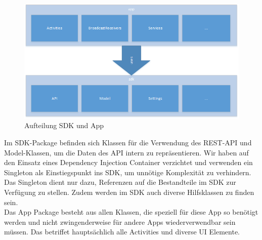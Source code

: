 \begin{figure}[H]
	\centering
		\includegraphics[width=\textwidth]{report/img/android_arch_sdk.png}
	\caption{Aufteilung SDK und App}
	\label{fig:androidArchSdk}
\end{figure}

Im SDK-Package befinden sich Klassen für die Verwendung des REST-API und Model-Klassen, um die Daten des API intern zu repräsentieren. Wir haben auf den Einsatz eines Dependency Injection Container verzichtet und verwenden ein Singleton als Einstiegspunkt ins SDK, um unnötige Komplexität zu verhindern. Das Singleton dient nur dazu, Referenzen auf die Bestandteile im SDK zur Verfügung zu stellen. Zudem werden im SDK auch diverse Hilfsklassen zu finden sein. \\
Das App Package besteht aus allen Klassen, die speziell für diese App so benötigt werden und nicht zwingenderweise für andere Apps wiederverwendbar sein müssen. Das betriffet hauptsächlich alle Activities und diverse UI Elemente.

